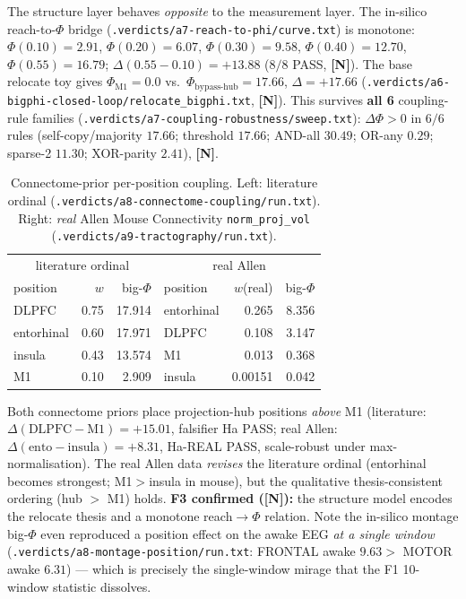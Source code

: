 \documentclass[11pt,a4paper]{article}
\providecommand{\tierGreen}{\textbf{[N]}}   %
\begin{document}
The structure layer behaves \emph{opposite} to the measurement layer. The
in-silico reach-to-$\Phi$ bridge (\texttt{.verdicts/a7-reach-to-phi/curve.txt})
is monotone: $\Phi(0.10){=}2.91$, $\Phi(0.20){=}6.07$, $\Phi(0.30){=}9.58$,
$\Phi(0.40){=}12.70$, $\Phi(0.55){=}16.79$;
$\Delta(0.55{-}0.10){=}{+}13.88$ ($8/8$ PASS, \tierGreen). The base relocate
toy gives $\Phi_{\text{M1}}{=}0.0$ vs.\ $\Phi_{\text{bypass-hub}}{=}17.66$,
$\Delta{=}{+}17.66$ (\texttt{.verdicts/a6-bigphi-closed-loop/relocate\_bigphi.txt},
\tierGreen). This survives \textbf{all 6} coupling-rule families
(\texttt{.verdicts/a7-coupling-robustness/sweep.txt}): $\Delta\Phi>0$ in $6/6$
rules (self-copy/majority $17.66$; threshold $17.66$; AND-all $30.49$; OR-any
$0.29$; sparse-2 $11.30$; XOR-parity $2.41$), \tierGreen.

\begin{table}[h]
\centering
\caption{Connectome-prior per-position coupling. Left: literature ordinal
(\texttt{.verdicts/a8-connectome-coupling/run.txt}). Right: \emph{real} Allen
Mouse Connectivity \texttt{norm\_proj\_vol}
(\texttt{.verdicts/a9-tractography/run.txt}).}
\label{tab:connectome}
\small
\begin{tabular}{@{}lrr@{\hskip 2em}lrr@{}}
\toprule
\multicolumn{3}{c}{literature ordinal} & \multicolumn{3}{c}{real Allen} \\
position & $w$ & big-$\Phi$ & position & $w$(real) & big-$\Phi$ \\
\midrule
DLPFC      & 0.75 & 17.914 & entorhinal & 0.265   & 8.356 \\
entorhinal & 0.60 & 17.971 & DLPFC      & 0.108   & 3.147 \\
insula     & 0.43 & 13.574 & M1         & 0.013   & 0.368 \\
M1         & 0.10 & 2.909  & insula     & 0.00151 & 0.042 \\
\bottomrule
\end{tabular}
\end{table}

\noindent
Both connectome priors place projection-hub positions \emph{above} M1
(literature: $\Delta(\text{DLPFC}{-}\text{M1}){=}{+}15.01$, falsifier Ha PASS;
real Allen: $\Delta(\text{ento}{-}\text{insula}){=}{+}8.31$, Ha-REAL PASS,
scale-robust under max-normalisation). The real Allen data \emph{revises} the
literature ordinal (entorhinal becomes strongest; M1$>$insula in mouse), but
the qualitative thesis-consistent ordering (hub $>$ M1) holds.
\textbf{F3 confirmed (\tierGreen):} the structure model encodes the relocate
thesis and a monotone reach$\to\Phi$ relation. Note the in-silico montage
big-$\Phi$ even reproduced a position effect on the awake EEG \emph{at a single
window} (\texttt{.verdicts/a8-montage-position/run.txt}: FRONTAL awake $9.63 >$
MOTOR awake $6.31$) --- which is precisely the single-window mirage that the
F1 10-window statistic dissolves.
\end{document}
